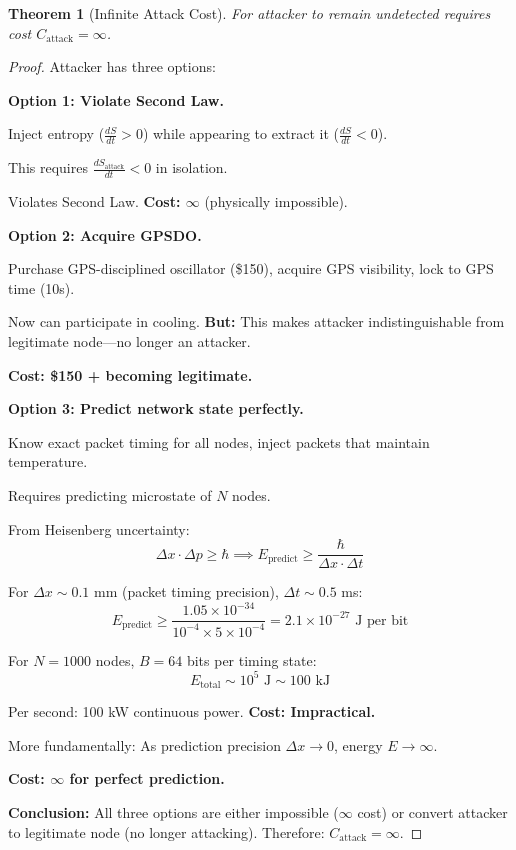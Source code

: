 \documentclass[twocolumn,10pt]{article}
\newtheorem{theorem}{Theorem}[section]
\theoremstyle{definition}
\theoremstyle{remark}
\begin{document}
\begin{theorem}[Infinite Attack Cost]
\label{thm:attack_cost}
For attacker to remain undetected requires cost $C_{\text{attack}} = \infty$.
\end{theorem}

\begin{proof}
Attacker has three options:

\vspace{0.2cm}
\noindent\textbf{Option 1: Violate Second Law.}

Inject entropy ($\frac{dS}{dt} > 0$) while appearing to extract it ($\frac{dS}{dt} < 0$).

This requires $\frac{dS_{\text{attack}}}{dt} < 0$ in isolation.

Violates Second Law. \textbf{Cost: $\infty$} (physically impossible).

\vspace{0.2cm}
\noindent\textbf{Option 2: Acquire GPSDO.}

Purchase GPS-disciplined oscillator (\$150), acquire GPS visibility, lock to GPS time (10s).

Now can participate in cooling. \textbf{But:} This makes attacker indistinguishable from legitimate node—no longer an attacker.

\textbf{Cost: \$150 + becoming legitimate.}

\vspace{0.2cm}
\noindent\textbf{Option 3: Predict network state perfectly.}

Know exact packet timing for all nodes, inject packets that maintain temperature.

Requires predicting microstate of $N$ nodes.

From Heisenberg uncertainty\cite{heisenberg1927}:
\begin{equation}
\Delta x \cdot \Delta p \geq \hbar \implies E_{\text{predict}} \geq \frac{\hbar}{\Delta x \cdot \Delta t}
\end{equation}

For $\Delta x \sim 0.1$ mm (packet timing precision), $\Delta t \sim 0.5$ ms:
\begin{equation}
E_{\text{predict}} \geq \frac{1.05 \times 10^{-34}}{10^{-4} \times 5 \times 10^{-4}} = 2.1 \times 10^{-27} \text{ J per bit}
\end{equation}

For $N=1000$ nodes, $B=64$ bits per timing state:
\begin{equation}
E_{\text{total}} \sim 10^5 \text{ J} \sim 100 \text{ kJ}
\end{equation}

Per second: 100 kW continuous power. \textbf{Cost: Impractical.}

More fundamentally: As prediction precision $\Delta x \to 0$, energy $E \to \infty$.

\textbf{Cost: $\infty$ for perfect prediction.}

\vspace{0.2cm}
\noindent\textbf{Conclusion:} All three options are either impossible ($\infty$ cost) or convert attacker to legitimate node (no longer attacking). Therefore: $C_{\text{attack}} = \infty$.
\end{proof}
\end{document}
